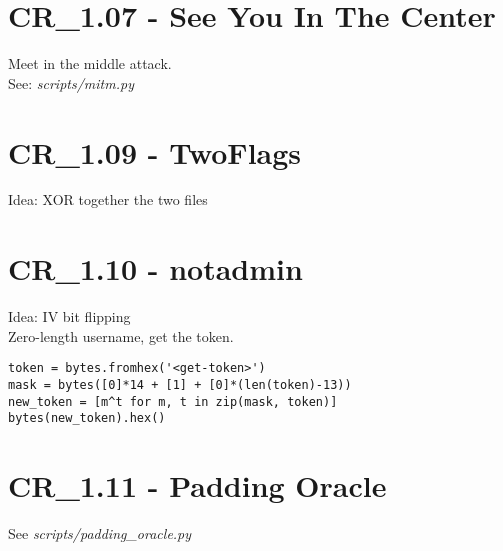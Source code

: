 \section{CR_1.07 - See You In The Center}
Meet in the middle attack. \\
See: \textit{scripts/mitm.py}

\section{CR_1.09 - TwoFlags}
Idea: XOR together the two files

\section{CR_1.10 - notadmin}
Idea: IV bit flipping \\

Zero-length username, get the token.
\begin{verbatim}
token = bytes.fromhex('<get-token>')
mask = bytes([0]*14 + [1] + [0]*(len(token)-13))
new_token = [m^t for m, t in zip(mask, token)]
bytes(new_token).hex()
\end{verbatim}

\section{CR_1.11 - Padding Oracle}
See \textit{scripts/padding_oracle.py}